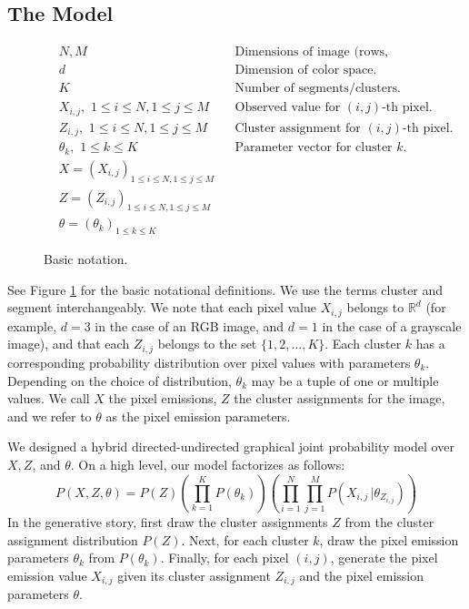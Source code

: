 \documentclass[12pt]{article}
\begin{document}
\subsection*{The Model}
\begin{figure}
\begin{align*}
&N, M \qquad &&\text{Dimensions of image (rows, columns).}\\
&d \qquad &&\text{Dimension of color space.}\\
&K \qquad &&\text{Number of segments/clusters.}\\
&X_{i,j}, \,\, 1\leq i \leq N, 1\leq j \leq M &&\text{Observed value for $(i,j)$-th pixel.}\\
&Z_{i,j}, \,\, 1\leq i \leq N, 1\leq j \leq M &&\text{Cluster assignment for $(i,j)$-th pixel.}\\
&\theta_k,\,\, 1\leq k \leq K &&\text{Parameter vector for cluster $k$.}\\
&X = (X_{i,j})_{1\leq i \leq N, 1 \leq j \leq M}\\
&Z = (Z_{i,j})_{1\leq i \leq N, 1 \leq j \leq M}\\
&\theta = (\theta_k)_{1\leq k \leq K}
\end{align*}
\caption{Basic notation.}
\label{equations}
\end{figure}
See Figure \ref{equations} for the basic notational definitions.
We use the terms cluster and segment interchangeably.
We note that each pixel value $X_{i,j}$ belongs to $\mathbb{R}^d$
(for example, $d=3$ in the case of an RGB image, and $d=1$ in the case
of a grayscale image), and that each $Z_{i,j}$ belongs to the set
$\{1,2,\ldots,K\}$. 
Each cluster $k$ has a corresponding probability distribution over pixel values
with parameters $\theta_k$. Depending on the choice of distribution,
$\theta_k$ may be a tuple of one or multiple values.
We call $X$ the pixel emissions, $Z$ the cluster assignments for the image, and
we refer to $\theta$ as the pixel emission parameters.

We designed a hybrid directed-undirected graphical joint probability model over $X, Z$, and $\theta$.
On a high level, our model factorizes as follows:
\[
P(X,Z,\theta) = P(Z)\left(\prod_{k=1}^KP(\theta_k)\right)
\left(\prod_{i=1}^N\prod_{j=1}^MP(X_{i,j}\,|\theta_{Z_{i,j}})\right)
\]
In the generative story,
first draw the cluster assignments $Z$ from the cluster assignment distribution $P(Z)$.
Next, for each cluster $k$, draw the pixel emission parameters $\theta_k$ from $P(\theta_k)$.
Finally, for each pixel $(i,j)$, generate the pixel emission value $X_{i,j}$ given its
cluster assignment $Z_{i,j}$ and the pixel emission parameters $\theta$.
\end{document}
